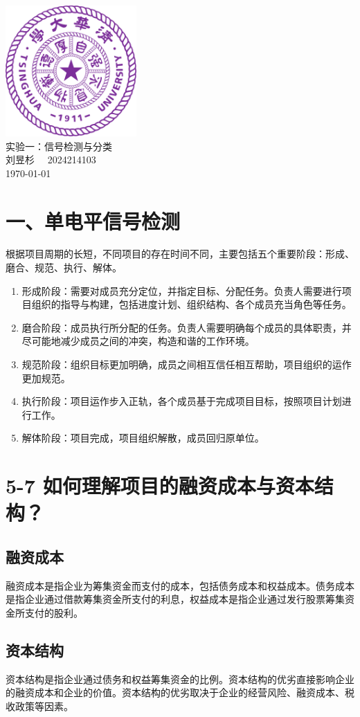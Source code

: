 \documentclass[12pt]{ctexart}
\begin{document}
\begin{titlepage}
    \begin{center}
        \includegraphics[width=5cm]{tsinghua_logo.png}\\[4cm]  %
        {\Huge 实验一：信号检测与分类} \\[4cm]
        {\large 刘昱杉  \ \  2024214103}\\[6cm]
        {\normalsize \today}\\[1cm]
    \end{center}
\end{titlepage}

\section*{一、单电平信号检测}
根据项目周期的长短，不同项目的存在时间不同，主要包括五个重要阶段：形成、磨合、规范、执行、解体。

\begin{figure}[h]
    \centering
    \label{fig:sample}
\end{figure}
\begin{enumerate}
    \item 形成阶段：需要对成员充分定位，并指定目标、分配任务。负责人需要进行项目组织的指导与构建，包括进度计划、组织结构、各个成员充当角色等任务。
    \item 磨合阶段：成员执行所分配的任务。负责人需要明确每个成员的具体职责，并尽可能地减少成员之间的冲突，构造和谐的工作环境。
    \item 规范阶段：组织目标更加明确，成员之间相互信任相互帮助，项目组织的运作更加规范。
    \item 执行阶段：项目运作步入正轨，各个成员基于完成项目目标，按照项目计划进行工作。
    \item 解体阶段：项目完成，项目组织解散，成员回归原单位。
\end{enumerate}

\section*{5-7 如何理解项目的融资成本与资本结构？}

\subsection*{融资成本}
融资成本是指企业为筹集资金而支付的成本，包括债务成本和权益成本。债务成本是指企业通过借款筹集资金所支付的利息，权益成本是指企业通过发行股票筹集资金所支付的股利。

\subsection*{资本结构}
资本结构是指企业通过债务和权益筹集资金的比例。资本结构的优劣直接影响企业的融资成本和企业的价值。资本结构的优劣取决于企业的经营风险、融资成本、税收政策等因素。
\end{document}
